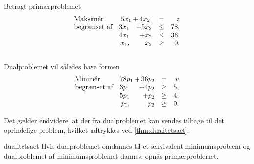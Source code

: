 %
\begin{eks}
\label{dual}
%
Betragt primærproblemet
%
\begin{align*}
\begin{array}{lrrlr}
\text{Maksimér}		&	\multicolumn{2}{c}{5x_1+4x_2}  & = & z\\
\text{begrænset af}	&3x_1& +5x_2			&\leq 	&78,\\
					&4x_1& + x_2				&\leq	& 36,\\
					&x_1,&  x_2				&\geq	& 0.
\end{array}
\end{align*}
\\
Dualproblemet vil således have formen
\begin{align*}
\begin{array}{lrrlr}
\text{Minimér}		&	\multicolumn{2}{c}{78p_1+36p_2}  & =  & v\\
\text{begrænset af}	&3p_1& +4p_2			&\geq 	&5,\\
					&5p_1& + p_2				&\geq	& 4,\\
					&p_1,&  p_2				&\geq	& 0.
\end{array}
\end{align*}
% 
%
\end{eks}
%
%
Det gælder endvidere, at der fra dualproblemet kan vendes tilbage til det oprindelige problem, hvilket udtrykkes ved \ref{thm:dualitetsaet}.
%
\begin{thm}{}{dualitetsaet}
Hvis dualproblemet omdannes til et ækvivalent minimumsproblem og dualproblemet af minimumsproblemet dannes, opnås primærproblemet.
\end{thm}
%

